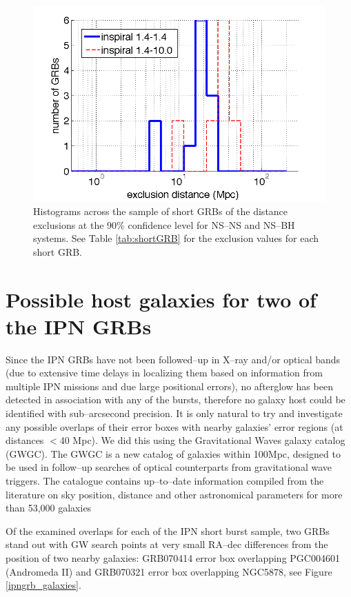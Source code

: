 \begin{figure}[ht!]
\centering
\includegraphics[width=28pc]{Images/dist_insp.png}
\caption{Histograms across the sample of short GRBs of the
distance exclusions at the 90\% confidence level for
NS--NS and NS--BH systems. See Table \ref{tab:shortGRB} 
for the exclusion values for each short GRB.}
\label{fig:dist_insp}
\end{figure}

\section{Possible host galaxies for two of the IPN GRBs}

Since the IPN GRBs have not been followed--up in X--ray and/or optical bands (due to extensive time delays in localizing them based on information from multiple IPN missions and due large positional errors), no afterglow has been detected in association with any of the bursts, therefore no galaxy host could be identified with sub--arcsecond precision. It is only natural to try and investigate any possible overlaps of their error boxes with nearby galaxies' error regions (at distances $<$40 Mpc). We did this using the Gravitational Waves galaxy catalog (GWGC). The GWGC is a new catalog of galaxies within 100Mpc, designed to be used in follow--up searches of optical counterparts from gravitational wave triggers. The catalogue contains up--to--date information compiled from the literature on sky position, distance and other astronomical parameters for more than 53,000 galaxies \cite{gwgc, White:2011qf}

Of the examined overlaps for each of the IPN short burst sample, two GRBs stand out with GW search points at very small RA--dec differences from the position of two nearby galaxies: GRB070414 error box overlapping PGC004601 (Andromeda II) and GRB070321 error box overlapping NGC5878, see Figure \ref{ipngrb_galaxies}.

